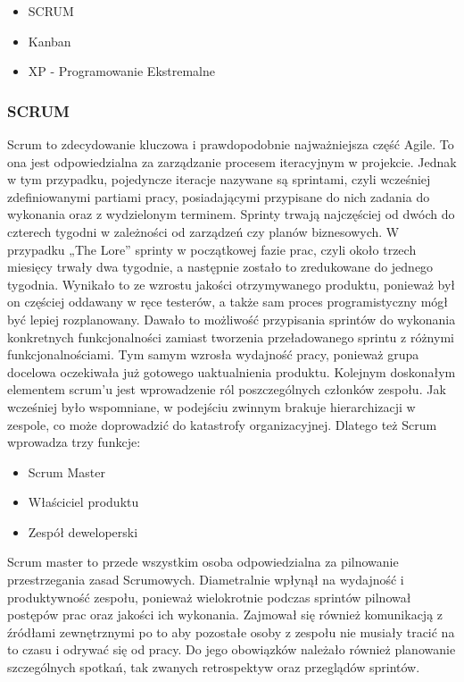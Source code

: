 \documentclass[oneside,polski,logo]{amuthesis}
\begin{document}
\begin{itemize}
	\item SCRUM
	\item Kanban
	\item XP - Programowanie Ekstremalne \\
\end{itemize}

\subsubsection{SCRUM}

Scrum to zdecydowanie kluczowa i prawdopodobnie najważniejsza część Agile. To ona jest odpowiedzialna za zarządzanie procesem iteracyjnym w projekcie. Jednak w tym przypadku, pojedyncze iteracje nazywane są sprintami, czyli wcześniej zdefiniowanymi partiami pracy, posiadającymi przypisane do nich zadania do wykonania oraz z wydzielonym terminem. Sprinty trwają najczęściej od dwóch do czterech tygodni w zależności od zarządzeń czy planów biznesowych. W przypadku „The Lore” sprinty w początkowej fazie prac, czyli około trzech miesięcy trwały dwa tygodnie, a następnie zostało to zredukowane do jednego tygodnia. Wynikało to ze wzrostu jakości otrzymywanego produktu, ponieważ był on częściej oddawany w ręce testerów, a także sam proces programistyczny mógł być lepiej rozplanowany. Dawało to możliwość przypisania sprintów do wykonania konkretnych funkcjonalności zamiast tworzenia przeładowanego sprintu z różnymi funkcjonalnościami. Tym samym wzrosła wydajność pracy, ponieważ grupa docelowa oczekiwała już gotowego uaktualnienia produktu. Kolejnym doskonałym elementem scrum’u jest wprowadzenie ról poszczególnych członków zespołu. Jak wcześniej było wspomniane, w podejściu zwinnym brakuje hierarchizacji w zespole, co może doprowadzić do katastrofy organizacyjnej.\cite{agileHunt} Dlatego też Scrum wprowadza trzy funkcje:

\begin{itemize}
	\item Scrum Master
	\item Właściciel produktu
	\item Zespół deweloperski \\
\end{itemize}

Scrum master to przede wszystkim osoba odpowiedzialna za pilnowanie przestrzegania zasad Scrumowych. Diametralnie wpłynął na wydajność i produktywność zespołu, ponieważ wielokrotnie podczas sprintów pilnował postępów prac oraz jakości ich wykonania. Zajmował się również komunikacją z źródłami zewnętrznymi po to aby pozostałe osoby z zespołu nie musiały tracić na to czasu i odrywać się od pracy. Do jego obowiązków należało również planowanie szczególnych spotkań, tak zwanych retrospektyw oraz przeglądów sprintów. \\
\end{document}
